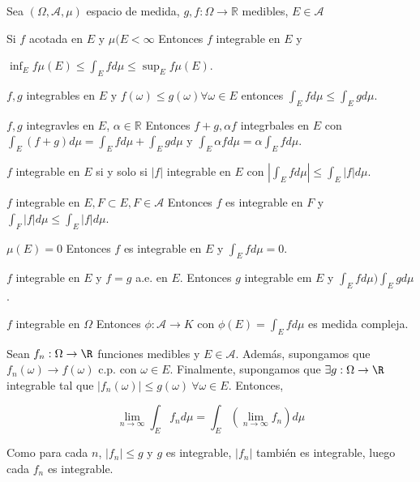 \begin{nprop}
    Sea $(\Omega, \mathcal{A}, \mu )$ espacio de medida, $g,f:\Omega\rightarrow\mathbb{R}$ medibles, $E \in\mathcal{A}$
    \begin{nlist}
    \item Si $f$ acotada en $E$ y $\mu(E<\infty$ Entonces $f$ integrable en $E$ y
    
    $\inf_E f\mu(E)\leq\int_E fd\mu\leq\sup_E f\mu(E)$.
    \item $f,g$ integrables en $E$ y $f(\omega)\leq g(\omega)\forall \omega\in E$ entonces $\int_E fd\mu \leq \int_E gd\mu$.
    \item $f,g$ integravles en $E$, $\alpha\in\mathbb{R}$ Entonces $f+g,\alpha f$ integrbales en $E$ con
    $\int_E (f+g)d\mu = \int_E fd\mu + \int_E gd\mu$ y $\int_E \alpha fd\mu = \alpha \int_E fd\mu$.
    \item $f$ integrable en $E$ si y solo si $|f|$ integrable en $E$ con $|\int_E fd\mu| \leq \int_E |f|d\mu$.
    \item $f$ integrable en $E, F\subset E, F\in\mathcal{A}$ Entonces $f$ es integrable en $F$ y $\int_F |f|d\mu \leq \int_E |f|d\mu$.
    \item $\mu(E)=0$ Entonces $f$ es integrable en $E$ y $\int_E fd\mu=0$.
    \item $f$ integrable en $E$ y $f=g$ a.e. en $E$. Entonces $g$ integrable em $E$ y $\int_E fd\mu ) \int_E gd\mu$.
    \item $f$ integrable en $\Omega$ Entonces $\phi:\mathcal{A}\rightarrow K$ con $\phi(E)=\int_E fd\mu$ es medida compleja.
    \end{nlist}
\end{nprop}



\begin{nth}
  Sean $f_n : \Omega \rightarrow \R$ funciones medibles y $E \in \mathscr A$. Además, supongamos que ${f_n(\omega)} \rightarrow f(\omega)$ c.p. con $\omega \in E$. Finalmente, supongamos que $\exists g: \Omega \rightarrow \R$ integrable tal que $|f_n(\omega)| \leq g(\omega) \ \forall \omega \in E$. Entonces,

  $$ \lim_{n \to \infty} \int_E f_n d \mu = \int_E  \left( \lim_{n \to \infty} f_n \right) d \mu$$
\end{nth}

\begin{nota}
  Como para cada $n$, $|f_n| \leq g$ y $g$ es integrable, $|f_n|$ también es integrable, luego cada $f_n$ es integrable.
\end{nota}

